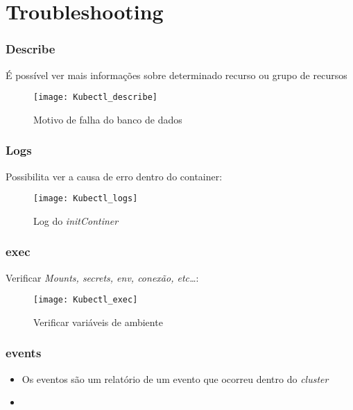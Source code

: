 \section{Troubleshooting}

\begin{frame}
\frametitle{Describe}
É possível ver mais informações sobre determinado recurso ou grupo de recursos
\begin{figure}[htpb]
	\centering
	\texttt{[image: Kubectl\_describe]}
	\caption{Motivo de falha do banco de dados}
\end{figure}
\end{frame}

\begin{frame}
\frametitle{Logs}
Possibilita ver a causa de erro dentro do container:
\begin{figure}[htpb]
	\centering
	\texttt{[image: Kubectl\_logs]}
	\caption{Log do \textit{initContiner}}
\end{figure}
\end{frame}

\begin{frame}
\frametitle{exec}
Verificar \textit{Mounts, secrets, env, conexão, etc\dots}:
\begin{figure}[htpb]
	\centering
	\texttt{[image: Kubectl\_exec]}
	\caption{Verificar variáveis de ambiente}
\end{figure}
\end{frame}

\begin{frame}
\frametitle{events}
\begin{itemize}
	\item Os eventos são um relatório de um evento que ocorreu dentro do \textit{cluster}
	\item {}
\end{itemize}

\end{frame}
